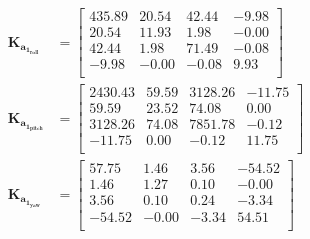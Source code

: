 \begin{equation}
	\begin{split}
			\boldsymbol{K_{a_{1_{roll}}}} &= \begin{bmatrix}
435.89 & 20.54 & 42.44 & -9.98 \\ 
20.54 & 11.93 & 1.98 & -0.00 \\ 
42.44 & 1.98 & 71.49 & -0.08 \\ 
-9.98 & -0.00 & -0.08 & 9.93 \\ 
		\end{bmatrix}\\ \boldsymbol{K_{a_{1_{pitch}}}} & = \begin{bmatrix}
2430.43 & 59.59 & 3128.26 & -11.75 \\ 
59.59 & 23.52 & 74.08 & 0.00 \\ 
3128.26 & 74.08 & 7851.78 & -0.12 \\ 
-11.75 & 0.00 & -0.12 & 11.75 \\ 
		\end{bmatrix}\\
\boldsymbol{K_{a_{1_{yaw}}}} &= 
\begin{bmatrix}
57.75 & 1.46 & 3.56 & -54.52 \\ 
1.46 & 1.27 & 0.10 & -0.00 \\ 
3.56 & 0.10 & 0.24 & -3.34 \\ 
-54.52 & -0.00 & -3.34 & 54.51 \\ 
\end{bmatrix}\\
	\end{split}
\end{equation}

